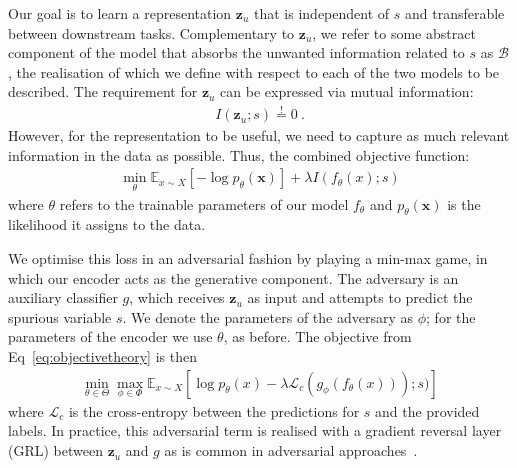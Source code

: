 Our goal is to learn a representation $\bm{z}_u$ that is independent of $s$ and transferable between downstream tasks.
Complementary to $\bm{z}_u$, we refer to some abstract component of the model that absorbs the unwanted information related to $s$ as $\mathcal{B}$, the realisation of which we define with respect to each of the two models to be described.
The requirement for $\bm{z}_u$ can be expressed via mutual information:
\begin{align}
  I(\bm{z}_u;s) \overset{!}{=} 0~.
  \label{eq:migoal}
\end{align}
However, for the representation to be useful, we need to capture as much relevant information in the data as possible.
Thus, the combined objective function:
\begin{align}
  \min_{\theta} \mathbb{E}_{x \sim X}[-\log p_\theta(\bm{x})] + \lambda I(f_\theta(x);s)
  \label{eq:objectivetheory}
\end{align}
where $\theta$ refers to the trainable parameters of our model $f_\theta$ and $p_\theta(\bm{x})$ is the likelihood it assigns to the data.

We optimise this loss in an adversarial fashion by playing a min-max game, in which our encoder acts as the generative component.
The adversary is an auxiliary classifier $g$, which receives $\bm{z}_u$ as input and attempts to predict the spurious variable $s$.
We denote the parameters of the adversary as $\phi$;
for the parameters of the encoder we use $\theta$, as before.
The objective from Eq~\eqref{eq:objectivetheory} is then%
\begin{align}
  \min_{\theta\in\Theta} \max_{\phi\in\Phi} \mathbb{E}_{x \sim X}[\log p_\theta(x) -\lambda\mathcal{L}_c(g_\phi(f_\theta(x))); s)]
  \label{eq:objectivepractical}
\end{align}
where $\mathcal{L}_c$ is the cross-entropy between the predictions for $s$ and the provided labels.
In practice, this adversarial term is realised with a gradient reversal layer (GRL) \cite{ganin2016domain} between $\bm{z}_u$ and $g$ as is common in adversarial approaches~\cite{edwardsstorkey}.

